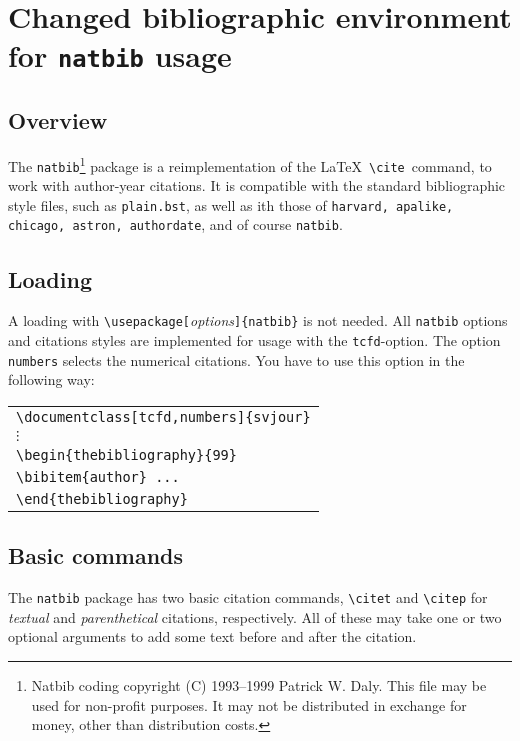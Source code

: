 \documentclass[final]{ltxguide}[1995/11/28]
\begin{document}
\section{Changed bibliographic environment\\
for {\tt natbib} usage}

\subsection*{Overview}

The {\tt natbib}\footnote{Natbib coding copyright (C) 1993--1999 Patrick
W. Daly. This file may be used for non-profit purposes. It may not be
distributed in exchange for money, other than distribution costs.}
package is a reimplementation of the \LaTeX\ \verb|\cite|\
command, to work with author-year citations. It is compatible with the
standard bibliographic style files, such as {\tt plain.bst}, as well as
ith those of {\tt harvard, apalike, chicago, astron, authordate}, and of
course {\tt natbib}.

\subsection*{Loading}

A loading with \verb|\usepackage[|{\it options}\verb|]{natbib}| is not
needed. All {\tt natbib} options and citations styles are implemented
for usage with the {\tt tcfd}-option. The option {\tt numbers} selects
the numerical citations. You have to use this option in the following way:

\begin{tabular}{l}
\verb|\documentclass[tcfd,numbers]{svjour}|\\
$\vdots$\\
\verb|\begin{thebibliography}{99}|\\
\verb|\bibitem{author} ...|\\
\verb|\end{thebibliography}|\\
\end{tabular}

\subsection*{Basic commands}

The {\tt natbib} package has two basic citation commands, \verb|\citet|
and \verb|\citep| for {\it textual} and {\it parenthetical} citations,
respectively. All of these may take one or two optional arguments to add
some text before and after the citation.
\end{document}
